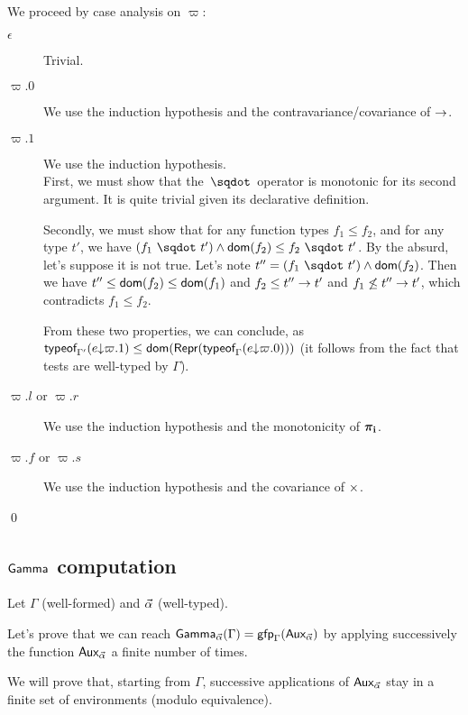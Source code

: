 \documentclass[a4paper]{article}
\theoremstyle{definition}
\begin{document}
      We proceed by case analysis on $\varpi$:
      \begin{description}
        \item[$\epsilon$] Trivial.
        \item[$\varpi.0$] We use the induction hypothesis and the contravariance/covariance of $\arrow {} {}$.
        \item[$\varpi.1$] We use the induction hypothesis.\\
        First, we must show that the $\worra {} {}$ operator is monotonic for its second argument.
        It is quite trivial given its declarative definition.

        Secondly, we must show that for any function types $f_1 \leq f_2$, and for any type $t'$,
        we have $(\worra {f_1} {t'}) \land \dom {f_2} \leq \worra {f_2} {t'}$. By the absurd, let's suppose it is not true.
        Let's note $t'' = (\worra {f_1} {t'}) \land \dom {f_2}$.
        Then we have $t'' \leq \dom {f_2} \leq \dom {f_1}$ and $f_2 \leq \arrow {t''} {t'}$ and
        $f_1 \not\leq \arrow {t''} {t'}$, which contradicts $f_1 \leq f_2$.

        From these two properties, we can conclude, as $\tyof {\occ e {\varpi.1}} {\Gamma'} \leq \dom {\tsrep {\tyof{\occ e{\varpi.0}}\Gamma}}$
        (it follows from the fact that tests are well-typed by $\Gamma$).
        \item[$\varpi.l$ or $\varpi.r$] We use the induction hypothesis and the monotonicity of $\bpi_{\mathbf{i}}$.
        \item[$\varpi.f$ or $\varpi.s$] We use the induction hypothesis and the covariance of $\pair {} {}$.
      \end{description}
    
      \qed

    \subsection{$\Ga {}$ computation}

    Let $\Gamma$ (well-formed) and $\tenv$ (well-typed).

    Let's prove that we can reach $\Genv \tenv \Gamma=\fixpoint_\Gamma (\Gaa \tenv)$ by applying successively the function $\Gaa \tenv$ a finite number of times.

    We will prove that, starting from $\Gamma$, successive applications of $\Gaa \tenv$ stay in a finite set of environments (modulo equivalence).
\end{document}
